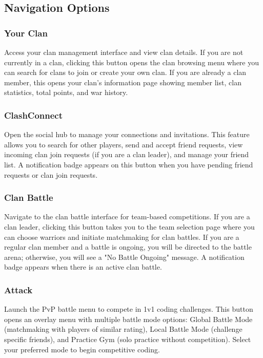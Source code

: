 \documentclass[12pt,a4paper]{article}
\begin{document}
\subsection{Navigation Options}

\subsubsection{Your Clan}

Access your clan management interface and view clan details. If you are not currently in a clan, clicking this button opens the clan browsing menu where you can search for clans to join or create your own clan. If you are already a clan member, this opens your clan's information page showing member list, clan statistics, total points, and war history.

\subsubsection{ClashConnect}

Open the social hub to manage your connections and invitations. This feature allows you to search for other players, send and accept friend requests, view incoming clan join requests (if you are a clan leader), and manage your friend list. A notification badge appears on this button when you have pending friend requests or clan join requests.

\subsubsection{Clan Battle}

Navigate to the clan battle interface for team-based competitions. If you are a clan leader, clicking this button takes you to the team selection page where you can choose warriors and initiate matchmaking for clan battles. If you are a regular clan member and a battle is ongoing, you will be directed to the battle arena; otherwise, you will see a "No Battle Ongoing" message. A notification badge appears when there is an active clan battle.

\subsubsection{Attack}

Launch the PvP battle menu to compete in 1v1 coding challenges. This button opens an overlay menu with multiple battle mode options: Global Battle Mode (matchmaking with players of similar rating), Local Battle Mode (challenge specific friends), and Practice Gym (solo practice without competition). Select your preferred mode to begin competitive coding.
\end{document}
